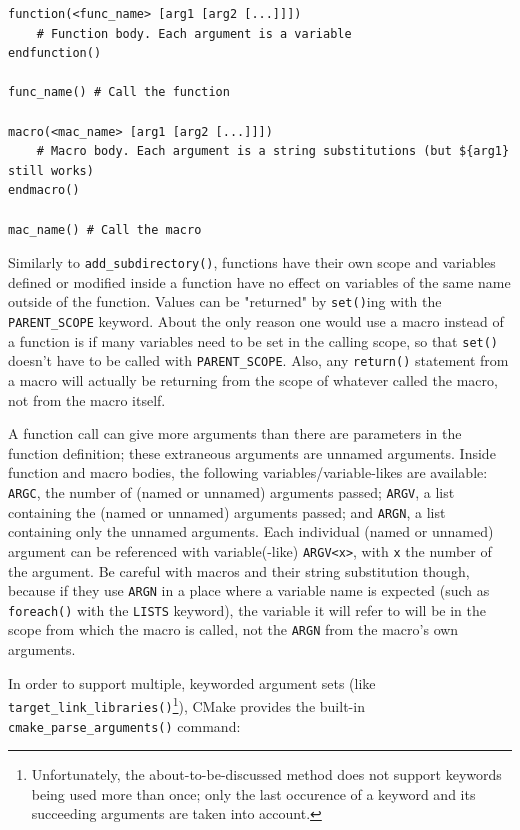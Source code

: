 \documentclass[table, xcdraw]{article}%
\begin{document}
\begin{verbatim}
function(<func_name> [arg1 [arg2 [...]]])
    # Function body. Each argument is a variable
endfunction()

func_name() # Call the function

macro(<mac_name> [arg1 [arg2 [...]]])
    # Macro body. Each argument is a string substitutions (but ${arg1} still works)
endmacro()

mac_name() # Call the macro
\end{verbatim}

Similarly to \texttt{add_subdirectory()}, functions have their own scope and variables defined or modified inside a function have no effect on variables of the same name outside of the function. Values can be "returned" by \texttt{set()}ing with the \texttt{PARENT_SCOPE} keyword. About the only reason one would use a macro instead of a function is if many variables need to be set in the calling scope, so that \texttt{set()} doesn't have to be called with \texttt{PARENT_SCOPE}. Also, any \texttt{return()} statement from a macro will actually be returning from the scope of whatever called the macro, not from the
macro itself.

A function call can give more arguments than there are parameters in the function definition; these extraneous arguments are unnamed arguments. Inside function and macro bodies, the following variables/variable-likes are available: \texttt{ARGC}, the number of (named or unnamed) arguments passed; \texttt{ARGV}, a list containing the (named or unnamed) arguments passed; and \texttt{ARGN}, a list containing only the unnamed arguments. Each individual (named or unnamed) argument can be referenced with variable(-like) \texttt{ARGV<x>}, with \texttt{x} the number of the argument. Be careful with macros and their string substitution though, because if they use \texttt{ARGN} in a place where a variable name is expected (such as \texttt{foreach()} with the \texttt{LISTS} keyword), the variable it will refer to will be in the scope from which the macro is called, not the \texttt{ARGN} from the macro’s own arguments.

In order to support multiple, keyworded argument sets (like \texttt{target_link_libraries()}\footnote{Unfortunately, the about-to-be-discussed method does not support keywords being used more than once; only the last occurence of a keyword and its succeeding arguments are taken into account.}), CMake provides the built-in \texttt{cmake_parse_arguments()} command:
\end{document}
